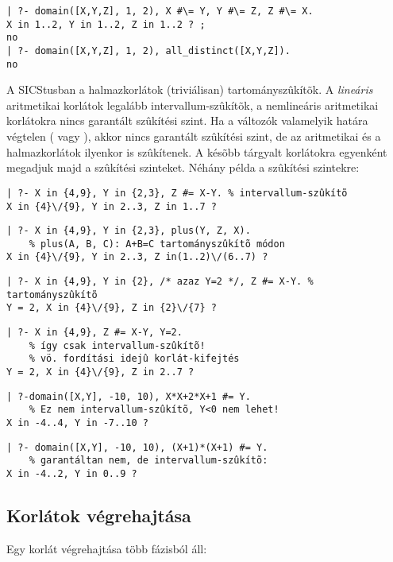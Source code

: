 \begin{verbatim}
| ?- domain([X,Y,Z], 1, 2), X #\= Y, Y #\= Z, Z #\= X.
X in 1..2, Y in 1..2, Z in 1..2 ? ;
no
| ?- domain([X,Y,Z], 1, 2), all_distinct([X,Y,Z]).
no
\end{verbatim}

A SICStusban a halmazkorlátok (triviálisan) tartományszûkítõk. A
\emph{lineáris} aritmetikai korlátok legalább intervallum-szûkítõk,
a nemlineáris aritmetikai korlátokra nincs garantált szûkítési szint.
Ha a változók valamelyik határa végtelen ( vagy ), akkor
nincs garantált szûkítési szint, de az aritmetikai és a halmazkorlátok
ilyenkor is szûkítenek. A késõbb tárgyalt korlátokra egyenként megadjuk majd
a szûkítési szinteket.
\br
Néhány példa a szûkítési szintekre:
\begin{verbatim}
| ?- X in {4,9}, Y in {2,3}, Z #= X-Y. % intervallum-szûkítõ
X in {4}\/{9}, Y in 2..3, Z in 1..7 ? 
\end{verbatim}
\begin{verbatim}
| ?- X in {4,9}, Y in {2,3}, plus(Y, Z, X).
    % plus(A, B, C): A+B=C tartományszûkítõ módon
X in {4}\/{9}, Y in 2..3, Z in(1..2)\/(6..7) ? 
\end{verbatim}
\begin{verbatim}
| ?- X in {4,9}, Y in {2}, /* azaz Y=2 */, Z #= X-Y. % tartományszûkítõ
Y = 2, X in {4}\/{9}, Z in {2}\/{7} ? 
\end{verbatim}
\begin{verbatim}
| ?- X in {4,9}, Z #= X-Y, Y=2.
    % így csak intervallum-szûkítõ!
    % vö. fordítási idejû korlát-kifejtés
Y = 2, X in {4}\/{9}, Z in 2..7 ? 
\end{verbatim}
\begin{verbatim}
| ?-domain([X,Y], -10, 10), X*X+2*X+1 #= Y.
    % Ez nem intervallum-szûkítõ, Y<0 nem lehet!
X in -4..4, Y in -7..10 ? 
\end{verbatim}
\begin{verbatim}
| ?- domain([X,Y], -10, 10), (X+1)*(X+1) #= Y.
    % garantáltan nem, de intervallum-szûkítõ:
X in -4..2, Y in 0..9 ?   
\end{verbatim}



\subsection{Korlátok végrehajtása}

\label{korlatvegrehajtas}

Egy korlát végrehajtása több fázisból áll:

